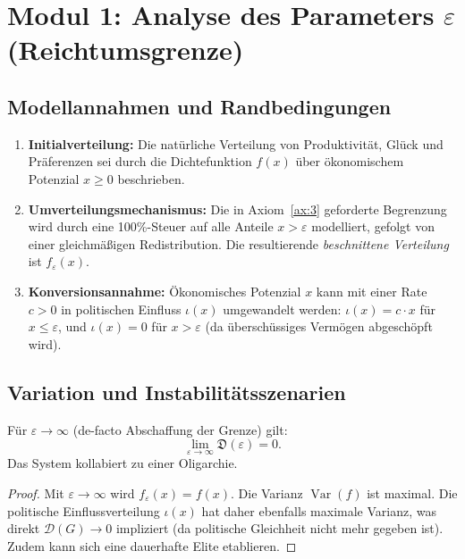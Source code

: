 \section{Modul 1: Analyse des Parameters $\varepsilon$ (Reichtumsgrenze)}
\label{sec:modul_epsilon}

\subsection{Modellannahmen und Randbedingungen}
\begin{enumerate}
    \item \textbf{Initialverteilung:} Die natürliche Verteilung von Produktivität, Glück und Präferenzen sei durch die Dichtefunktion $f(x)$ über ökonomischem Potenzial $x \geq 0$ beschrieben.
    \item \textbf{Umverteilungsmechanismus:} Die in Axiom~\ref{ax:3} geforderte Begrenzung wird durch eine 100\%-Steuer auf alle Anteile $x > \varepsilon$ modelliert, gefolgt von einer gleichmäßigen Redistribution. Die resultierende \emph{beschnittene Verteilung} ist $f_\varepsilon(x)$.
    \item \textbf{Konversionsannahme:} Ökonomisches Potenzial $x$ kann mit einer Rate $c > 0$ in politischen Einfluss $\iota(x)$ umgewandelt werden: $\iota(x) = c \cdot x$ für $x \leq \varepsilon$, und $\iota(x) = 0$ für $x > \varepsilon$ (da überschüssiges Vermögen abgeschöpft wird).
\end{enumerate}

\subsection{Variation und Instabilitätsszenarien}

\begin{theorem}
    Für $\varepsilon \to \infty$ (de-facto Abschaffung der Grenze) gilt:
    \[
    \lim_{\varepsilon \to \infty} \mathfrak{D}(\varepsilon) = 0.
    \]
    Das System kollabiert zu einer Oligarchie.
\end{theorem}

\begin{proof}
    Mit $\varepsilon \to \infty$ wird $f_\varepsilon(x) = f(x)$. Die Varianz $\operatorname{Var}(f)$ ist maximal. Die politische Einflussverteilung $\iota(x)$ hat daher ebenfalls maximale Varianz, was direkt $\mathcal{D}(G) \to 0$ impliziert (da politische Gleichheit nicht mehr gegeben ist). Zudem kann sich eine dauerhafte Elite etablieren.
\end{proof}

